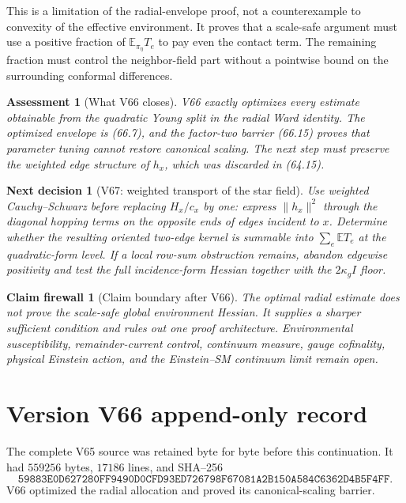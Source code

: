\documentclass[11pt]{article}
\newtheorem{firewall}[theorem]{Claim firewall}
\newtheorem{decision}[theorem]{Next decision}
\newtheorem{assessment}[theorem]{Assessment}
\theoremstyle{remark}
\begin{document}
This is a limitation of the radial-envelope proof, not a counterexample
to convexity of the effective environment.  It proves that a
scale-safe argument must use a positive fraction of
\(\mathbb E_{\pi_\eta}T_e\) to pay even the contact term.  The remaining
fraction must control the neighbor-field part without a pointwise bound
on the surrounding conformal differences.

\begin{assessment}[What V66 closes]
\label{ass:v17v66-status}
V66 exactly optimizes every estimate obtainable from the quadratic
Young split in the radial Ward identity.  The optimized envelope is
(66.7), and the factor-two barrier (66.15) proves that parameter tuning
cannot restore canonical scaling.  The next step must preserve the
weighted edge structure of \(h_x\), which was discarded in (64.15).
\end{assessment}

\begin{decision}[V67: weighted transport of the star field]
\label{dec:v17v66-next}
Use weighted Cauchy--Schwarz before replacing \(H_x/c_x\) by one:
express \(\|h_x\|^2\) through the diagonal hopping terms on the
opposite ends of edges incident to \(x\).  Determine whether the
resulting oriented two-edge kernel is summable into
\(\sum_e\mathbb ET_e\) at the quadratic-form level.  If a local
row-sum obstruction remains, abandon edgewise positivity and test the
full incidence-form Hessian together with the \(2\kappa_gI\) floor.
\end{decision}

\begin{firewall}[Claim boundary after V66]
\label{fire:v17v66}
The optimal radial estimate does not prove the scale-safe global
environment Hessian.  It supplies a sharper sufficient condition and
rules out one proof architecture.  Environmental susceptibility,
remainder-current control, continuum measure, gauge cofinality,
physical Einstein action, and the Einstein--SM continuum limit remain
open.
\end{firewall}

\section*{Version V66 append-only record}
The complete V65 source was retained byte for byte before this
continuation.  It had \(559256\) bytes, \(17186\) lines, and SHA--256
\[
 \texttt{59883E0D627280FF9490D0CFD93ED726798F67081A2B150A584C6362D4B5F4FF}.
\]
V66 optimized the radial allocation and proved its canonical-scaling
barrier.
\end{document}
